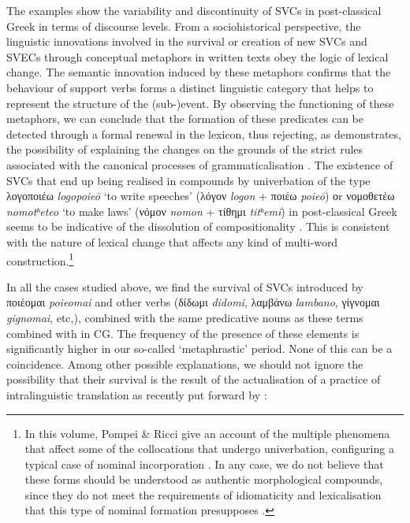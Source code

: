 \documentclass[output=paper,colorlinks,citecolor=brown]{langscibook}
\begin{document}
\z

The examples  show the variability and discontinuity of SVCs in
post-classical Greek in terms of discourse levels. From a sociohistorical perspective, the
linguistic innovations involved in the survival or creation of new SVCs and SVECs through
conceptual metaphors in written texts obey the logic of lexical change. The semantic
innovation induced by these metaphors confirms that the behaviour of support verbs forms a
distinct linguistic category that helps to represent the structure of the (sub-)event. By
observing the functioning of these metaphors, we can conclude that the formation of these
predicates can be detected through a formal renewal in the lexicon, thus rejecting, as
\citet{ButtMiriam-2010672} demonstrates, the possibility of explaining the changes on the
grounds of the strict rules associated with the canonical processes of grammaticalisation
\parencite{HopperPaulJ.andClossTraugottElizabeth-2003499}. The existence of SVCs that end
up being realised in compounds by univerbation of the type λογοποιέω \emph{logopoieō} `to
write speeches' (λόγον \emph{logon} + ποιέω \emph{poieō}) οr νομοθετέω
\emph{nomotʰeteo} `to make laws' (νόμον \emph{nomon} + τίθημι
\emph{titʰemi}) in post-classical Greek seems to be indicative of the
dissolution of compositionality \parencite{PompeiAnna-200619}. This is consistent with the
nature of lexical change that affects any kind of multi-word construction.\footnote{In
  this volume, Pompei \& Ricci give an account of the multiple phenomena that affect some
  of the collocations that undergo univerbation, configuring a typical case of nominal
  incorporation \parencite{VivesCuestaAlfonso-2012307}. In any case, we do not believe
  that these forms should be understood as authentic morphological compounds, since they
  do not meet the requirements of idiomaticity and lexicalisation that this type of
  nominal formation presupposes \parencite[30--33]{TribulatoOlga2015}.}

In all the cases studied above, we find the survival of SVCs introduced by ποιέομαι
\emph{poieomai} and other verbs (δίδωμι \emph{didomi}, λαμβάνω \emph{lambano}, γίγνομαι
\emph{gignomai}, etc,), combined with the same predicative nouns as these terms combined
with in CG. The frequency of the presence of these elements is significantly higher in
our so-called `metaphrastic' period. None of this can be a coincidence. Among other
possible explanations, we should not ignore the possibility that their survival is the
result of the actualisation of a practice of intralinguistic translation as
recently put forward by \citet[94]{LavidasNikolaos-2022877}:
\end{document}
